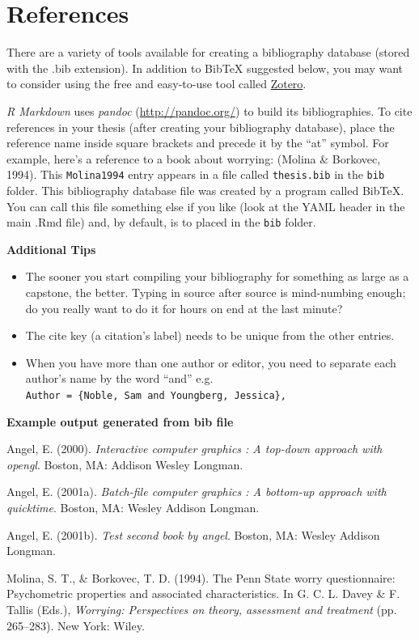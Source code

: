 \documentclass[12pt,oneside]{chicagocapstone}
\providecommand{\tightlist}{%
  \setlength{\itemsep}{0pt}\setlength{\parskip}{0pt}}
\begin{document}
\backmatter

\chapter*{References}\label{references}


\noindent

\setlength{\parindent}{-0.20in} \setlength{\leftskip}{0.20in}
\setlength{\parskip}{8pt}

There are a variety of tools available for creating a bibliography
database (stored with the .bib extension). In addition to BibTeX
suggested below, you may want to consider using the free and easy-to-use
tool called \href{https://www.zotero.org/}{Zotero}.

\emph{R Markdown} uses \emph{pandoc} (\url{http://pandoc.org/}) to build
its bibliographies. To cite references in your thesis (after creating
your bibliography database), place the reference name inside square
brackets and precede it by the ``at'' symbol. For example, here's a
reference to a book about worrying: (Molina \& Borkovec, 1994). This
\texttt{Molina1994} entry appears in a file called \texttt{thesis.bib}
in the \texttt{bib} folder. This bibliography database file was created
by a program called BibTeX. You can call this file something else if you
like (look at the YAML header in the main .Rmd file) and, by default, is
to placed in the \texttt{bib} folder.

\textbf{Additional Tips}
\begin{itemize}
\tightlist
\item
  The sooner you start compiling your bibliography for something as
  large as a capstone, the better. Typing in source after source is
  mind-numbing enough; do you really want to do it for hours on end at
  the last minute?
\item
  The cite key (a citation's label) needs to be unique from the other
  entries.
\item
  When you have more than one author or editor, you need to separate
  each author's name by the word ``and'' e.g.
  \texttt{Author\ =\ \{Noble,\ Sam\ and\ Youngberg,\ Jessica\},}
\end{itemize}
\textbf{Example output generated from bib file}

\hypertarget{refs}{}
\hypertarget{ref-angel2000}{}
Angel, E. (2000). \emph{Interactive computer graphics : A top-down
approach with opengl}. Boston, MA: Addison Wesley Longman.

\hypertarget{ref-angel2001}{}
Angel, E. (2001a). \emph{Batch-file computer graphics : A bottom-up
approach with quicktime}. Boston, MA: Wesley Addison Longman.

\hypertarget{ref-angel2002a}{}
Angel, E. (2001b). \emph{Test second book by angel}. Boston, MA: Wesley
Addison Longman.

\hypertarget{ref-Molina1994}{}
Molina, S. T., \& Borkovec, T. D. (1994). The Penn State worry
questionnaire: Psychometric properties and associated characteristics.
In G. C. L. Davey \& F. Tallis (Eds.), \emph{Worrying: Perspectives on
theory, assessment and treatment} (pp. 265--283). New York: Wiley.


\end{document}
